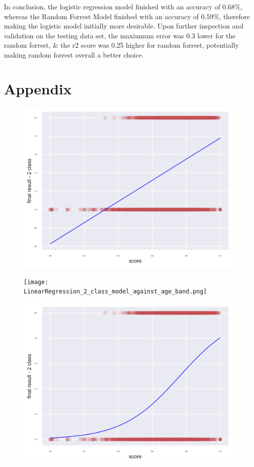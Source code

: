 \documentclass[11pt, a4paper, twocolumn]{article}
\begin{document}
In conclusion, the logistic regression model finished with an accuracy of 0.68\%, whereas the Random Forrest Model finished with an accuracy of 0.59\%, therefore making the logistic model initially more desirable.
Upon further inspection and validation on the testing data set, the maxiumum error was 0.3 lower for the random forrest, \& the r2 score was 0.25 higher for random forrest, potentially making random forrest overall a better choice.

\section*{Appendix}

\begin{figure}[h]
	\includegraphics[width=\linewidth]{LinearRegression_2_class_model_against_score.png} 
	\label{fig:LinScore}
\end{figure}
\centering
\begin{figure}[h]
	\texttt{[image: LinearRegression\_2\_class\_model\_against\_age\_band.png]} 
	\label{fig:LinAge}
\end{figure}
\centering
\begin{figure}[h]
	\includegraphics[width=\linewidth]{LogisticRegression_2_class_model_against_score.png} 
	\label{fig:LogScore}
\end{figure}
\end{document}

